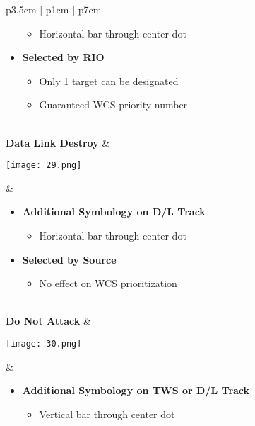 \documentclass[8pt,usenames,dvipsnames,twoside]{article}
\begin{document}
\begin{center}
\begin{longtable}{p{3.5cm} | p{1cm} | p{7cm}}
\begin{minipage}[t]{\linewidth}
\begin{itemize}
\begin{itemize}
							\item Horizontal bar through center dot
						\end{itemize}
						\item \textbf{Selected by RIO}
						\begin{itemize}
							\item Only 1 target can be designated
							\item Guaranteed WCS priority number
						\end{itemize}
					\end{itemize}
				\end{minipage} \\
				\midrule
				\textbf{Data Link Destroy }&
				\begin{minipage}[t]{\linewidth}
					\vspace{-7pt}
					\centering
					\texttt{[image: 29.png]}
				\end{minipage} &  
				\begin{minipage}[t]{\linewidth}
					\vspace{-7pt}
					\begin{itemize}
						\item \textbf{Additional Symbology on D/L Track}
						\begin{itemize}
							\item Horizontal bar through center dot
						\end{itemize}
						\item \textbf{Selected by Source}
						\begin{itemize}
							\item No effect on WCS prioritization
						\end{itemize}
					\end{itemize}
				\end{minipage} \\
				\midrule
				\textbf{Do Not Attack} &
				\begin{minipage}[t]{\linewidth}
					\vspace{-7pt}
					\centering
					\texttt{[image: 30.png]}
				\end{minipage} &  
				\begin{minipage}[t]{\linewidth}
					\vspace{-7pt}
					\begin{itemize}
						\item \textbf{Additional Symbology on TWS or D/L Track}
						\begin{itemize}
							\item Vertical bar through center dot

\end{itemize}
\end{itemize}
\end{minipage}
\end{longtable}
\end{center}
\end{document}
